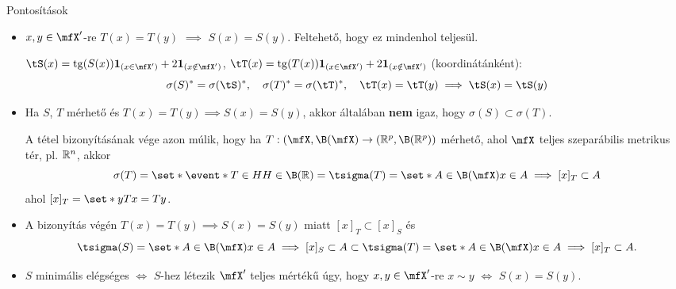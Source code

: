 \documentclass[aspectratio=169,notheorems,9pt,\option]{beamer}
\begin{document}
\begin{frame}{Pontosítások}
  \begin{itemize}
    \item $x,y\in \mfX'$-re $T(x)=T(y)$ $\implies$ $S(x)=S(y)$. Feltehető, hogy ez mindenhol teljesül.
    
    $\tS(x)=\tg(S(x))\I{x\in \mfX'}+2\I{x\notin\mfX'}$, 
    $\tT(x)=\tg(T(x))\I{x\in \mfX'}+2\I{x\notin\mfX'}$ (koordinátánként): %
    \begin{displaymath}
      \sigma(S)^*=\sigma(\tS)^*,\quad \sigma(T)^*=\sigma(\tT)^*,\quad 
      \tT(x)=\tT(y) \implies\tS(x)=\tS(y)
    \end{displaymath} 
    \item  Ha $S$, $T$ mérhető és $T(x)=T(y)\implies S(x)=S(y)$, akkor általában \textbf{nem} igaz, 
    hogy $\sigma(S)\subset\sigma(T)$. 

    A tétel bizonyításának vége azon múlik, hogy 
    ha $T:(\mfX,\B(\mfX)\to(\real^p,\B(\real^p))$ mérhető, 
    ahol $\mfX$ teljes szeparábilis metrikus tér, pl. $\mathbb{R}^n$, akkor 
    \begin{displaymath}
      \sigma(T)=\set*{\event*{T\in H}}{H\in\B(\real)}=\tsigma(T)=\set*{A\in\B(\mfX)}{x\in A\implies [x]_T\subset A}
    \end{displaymath}
    ahol $[x]_T=\set*{y}{Tx=Ty}$.
    
    \item A bizonyítás végén $T(x)=T(y)\implies S(x)=S(y)$ miatt $[x]_T\subset [x]_S$ és 
    \begin{displaymath}
      \tsigma(S)=\set*{A\in\B(\mfX)}{x\in A\implies [x]_S\subset A}\subset
      \tsigma(T)=\set*{A\in\B(\mfX)}{x\in A\implies [x]_T\subset A}.
    \end{displaymath}
    \item $S$ minimális elégséges $\iff$ $S$-hez létezik $\mfX'$ teljes mértékű úgy, hogy $x,y\in\mfX'$-re $x\sim y$ $\iff$ $S(x)=S(y)$. 
  \end{itemize}
\end{frame}
\end{document}
